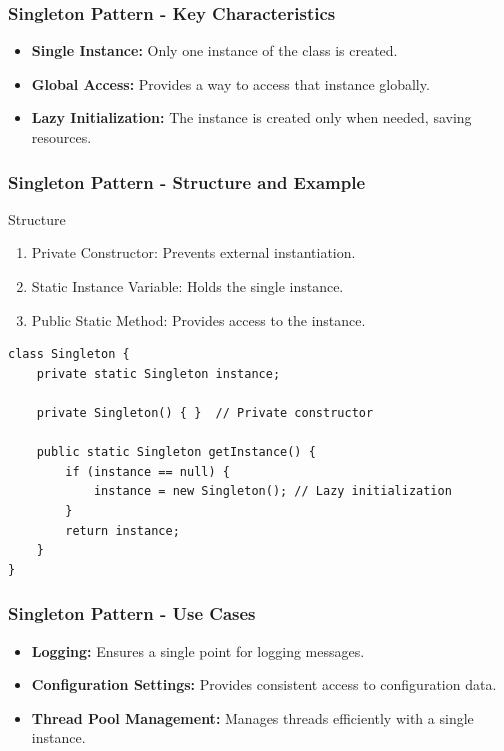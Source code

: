 \documentclass{beamer}
\begin{document}
\begin{frame}[fragile]
    \frametitle{Singleton Pattern - Key Characteristics}
    \begin{itemize}
        \item \textbf{Single Instance:} Only one instance of the class is created.
        \item \textbf{Global Access:} Provides a way to access that instance globally.
        \item \textbf{Lazy Initialization:} The instance is created only when needed, saving resources.
    \end{itemize}
\end{frame}

\begin{frame}[fragile]
    \frametitle{Singleton Pattern - Structure and Example}
    \begin{block}{Structure}
    \begin{enumerate}
        \item Private Constructor: Prevents external instantiation.
        \item Static Instance Variable: Holds the single instance.
        \item Public Static Method: Provides access to the instance.
    \end{enumerate}
    \end{block}

    \begin{lstlisting}[language=pseudocode]
class Singleton {
    private static Singleton instance;

    private Singleton() { }  // Private constructor

    public static Singleton getInstance() {
        if (instance == null) {
            instance = new Singleton(); // Lazy initialization
        }
        return instance;
    }
}
    \end{lstlisting}
\end{frame}

\begin{frame}[fragile]
    \frametitle{Singleton Pattern - Use Cases}
    \begin{itemize}
        \item \textbf{Logging:} Ensures a single point for logging messages.
        \item \textbf{Configuration Settings:} Provides consistent access to configuration data.
        \item \textbf{Thread Pool Management:} Manages threads efficiently with a single instance.
    \end{itemize}
\end{frame}
\end{document}
